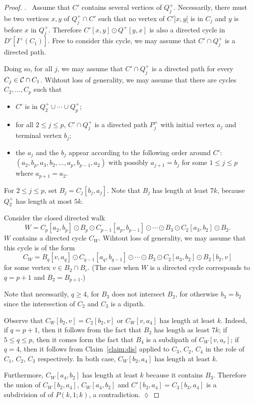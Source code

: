 \documentclass[utf8,10pt]{article}
\theoremstyle{plain}
\theoremstyle{definition}
\theoremstyle{remark}
\newenvironment{subproof}{\par\noindent {\it Subproof}.\ }{\hfill$\lozenge$\par\vspace{11pt}}
\begin{document}
\begin{proof}
\begin{subproof}
Assume that $C'$ contains several vertices of $Q^+_j$.
Necessarily, there must be two vertices $x,y$ of $Q^+_j\cap C'$ such that no vertex of $C']x,y[$ is in $C_j$ and  $y$ is before $x$ in $Q^+_j$.
Therefore $C'[x,y]\odot Q^+[y,x]$ is also a directed cycle in $D'[I^+(C_1)]$. Free to consider this cycle,
we may assume that $C'\cap Q^+_j$ is a directed path.

Doing so, for all $j$, we may assume that $C'\cap Q^+_j$ is a directed path  for every $C_j\in {\cal C}\cap C_1$.
Wihtout loss of generality, we may assume that there are cycles $C_2, \dots , C_p$ such that
\begin{itemize}
\item $C'$ is in $Q^+_2\cup \cdots  \cup Q^+_p$;
\item for all $2\leq j\leq p$, $C'\cap Q^+_j$ is a directed path $P^+_j$ with initial vertex $a_j$ and terminal vertex $b_j$;
\item the $a_j$ and the $b_j$ appear according to the following order around $C'$: $(a_2, b_p, a_3, b_2, \dots ,   a_p, b_{p-1}, a_2)$ with possibly $a_{j+1}=b_j$ for some $1\leq j \leq p$ where $a_{p+1}=a_2$.
\end{itemize}
For $2\leq j\leq p$, set $B_j=C_j[b_j, a_j]$. Note that $B_j$ has length at least $7k$, because $Q^+_2$ has length at most $5k$.


Consider the closed directed walk $$W=C_p[a_2,b_p]\odot B_p \odot C_{p-1}[a_p, b_{p-1}] \odot  \cdots  \odot  B_3\odot C_2[a_3, b_2]\odot B_2.$$
$W$ contains a directed cycle $C_W$. Wihtout loss of generality, we may assume that this cycle is of the form
$$C_W=B_q[v, a_q] \odot C_{q-1}[a_q, b_{q-1}] \odot  \cdots  \odot  B_3\odot C_2[a_3, b_2]\odot B_2[b_2, v]$$
for some vertex $v\in B_2\cap B_r$. (The case when $W$ is a directed cycle corresponds to $q=p+1$ and $B_2=B_{p+1}$.)

Note that necessarily, $q\geq 4$, for $B_3$ does not intersect $B_2$, for otherwise $b_3=b_2$ since the intersection of $C_2$ and $C_3$ is a dipath.

Observe that $C_W[b_2,v]=C_2[b_2,v]$ or $C_W[v, a_4]$ has length at least $k$.
Indeed, if $q=p+1$, then it follows from the fact that $B_2$ has length as least $7k$; if
$5\leq q\leq p$, then it comes form the fact that $B_4$ is a subdipath of $C_W[v, a_r]$; if $q=4$, then it follows from Claim~\ref{claim:dis}  applied to $C_3$, $C_2$, $C_4$ in the role of $C_1$, $C_2$, $C_3$ respectively.
In both case, $C_W[b_2, a_4]$ has length at least $k$. 

Furthermore, $C_W[a_4,b_2]$ has length at least $k$ because it contains $B_3$. Therefore the union of
$C_W[b_2, a_4]$, $C_W[a_4,b_2]$ and $C'[b_2,a_4]=C_3[b_3,a_4]$ is a subdivision of of $P(k,1;k)$, a contradiction.
\end{subproof}





\end{proof}
\end{document}
